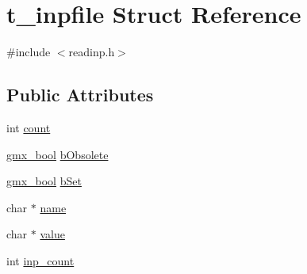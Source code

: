\hypertarget{structt__inpfile}{\section{t\-\_\-inpfile \-Struct \-Reference}
\label{structt__inpfile}
}


{\ttfamily \#include $<$readinp.\-h$>$}

\subsection*{\-Public \-Attributes}
\begin{DoxyCompactItemize}
\item 
int \hyperlink{structt__inpfile_ac2b088ab77a0008afdcafc07999d6e4a}{count}
\item 
\hyperlink{include_2types_2simple_8h_a8fddad319f226e856400d190198d5151}{gmx\-\_\-bool} \hyperlink{structt__inpfile_ab0e307d2b1457a75ab8e02d30f90fcb3}{b\-Obsolete}
\item 
\hyperlink{include_2types_2simple_8h_a8fddad319f226e856400d190198d5151}{gmx\-\_\-bool} \hyperlink{structt__inpfile_a6a1dc761910f299b8eac3e109fca1746}{b\-Set}
\item 
char $\ast$ \hyperlink{structt__inpfile_a27a9732bdcf8d59e5bc7d55ed6e9a139}{name}
\item 
char $\ast$ \hyperlink{structt__inpfile_ade98bed6c75fdb7cd3bff07dac1dedc4}{value}
\item 
int \hyperlink{structt__inpfile_a783b9464a942e0b1a39911559d710adc}{inp\-\_\-count}
\end{DoxyCompactItemize}


